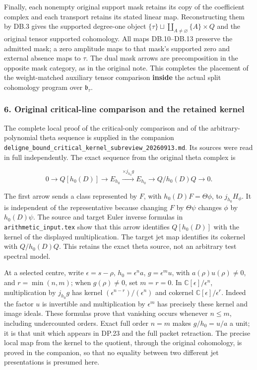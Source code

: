 Finally, each nonempty original support mask retains its copy of the coefficient complex and each transport retains its stated linear map. Reconstructing them by DB.3 gives the supported degree-one object \(\{\tau\}\sqcup\coprod_{A\ne\varnothing}\{A\}\times Q\) and the original tensor supported cohomology. All maps DB.10--DB.13 preserve the admitted mask; a zero amplitude maps to that mask's supported zero and external absence maps to \(\tau\). The dual mask arrows are precomposition in the opposite mask category, as in the original note. This completes the placement of the weight-matched auxiliary tensor comparison \textbf{inside} the actual split cohomology program over \(\mathfrak b_\tau\).

\subsubsection{6. Original critical-line comparison and the retained kernel}\label{endpoint-purity_review--original-critical-line-comparison-and-the-retained-kernel}

The complete local proof of the critical-only comparison and of the arbitrary-polynomial theta sequence is supplied in the companion \nolinkurl{deligne_bound_critical_kernel_subreview_20260913.md}. Its sources were read in full independently. The exact sequence from the original theta complex is

\[
0\longrightarrow Q[h_0(D)]\longrightarrow E_{h_0}
 \xrightarrow{\times j_{h_0}g}E_{h_0}
 \longrightarrow Q/h_0(D)Q\longrightarrow0.
\tag{DP.34}
\]

The first arrow sends a class represented by \(F\), with \(h_0(D)F=\Theta\phi\), to \(j_{h_0}H_\phi\). It is independent of the representative because changing \(F\) by \(\Theta\psi\) changes \(\phi\) by \(h_0(D)\psi\). The source and target Euler inverse formulas in \nolinkurl{arithmetic_input.tex} show that this arrow identifies \(Q[h_0(D)]\) with the kernel of the displayed multiplication. The target jet map identifies its cokernel with \(Q/h_0(D)Q\). This retains the exact theta source, not an arbitrary test spectral model.

At a selected centre, write \(\epsilon=s-\rho\), \(h_0=\epsilon^n a\), \(g=\epsilon^m u\), with \(a(\rho)u(\rho)\ne0\), and \(r=\min(n,m)\); when \(g(\rho)\ne0\), set \(m=r=0\). In \(\mathbb C[\epsilon]/\epsilon^n\), multiplication by \(j_{h_0}g\) has kernel \((\epsilon^{n-r})/(\epsilon^n)\) and cokernel \(\mathbb C[\epsilon]/\epsilon^r\). Indeed the factor \(u\) is invertible and multiplication by \(\epsilon^m\) has precisely these kernel and image ideals. These formulas prove that vanishing occurs whenever \(n\le m\), including undercounted orders. Exact full order \(n=m\) makes \(g/h_0=u/a\) a unit; it is that unit which appears in DP.23 and the full packet retraction. The precise local map from the kernel to the quotient, through the original cohomology, is proved in the companion, so that no equality between two different jet presentations is presumed here.

